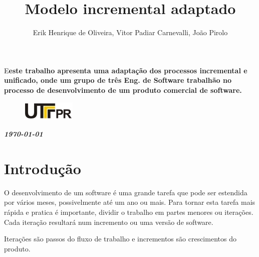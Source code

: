 \documentclass[	DIV=calc,%
							paper=a4,%
							fontsize=12pt,%
							onecolumn]{scrartcl}	 					%
\title{Modelo incremental adaptado }					%
\author{Erik Henrique de Oliveira, Vitor Padiar Carnevalli, João Pirolo }  	%
\date{}																				%
\newcommand{\initial}[1]{%
     \lettrine[lines=3,lhang=0.3,nindent=0em]{
     				\color{DarkGoldenrod}
     				{\textsf{#1}}}{}}
\begin{document}
\maketitle
\thispagestyle{fancy} 	
\thispagestyle{empty}		%




\initial{E}\textbf{este trabalho apresenta uma adaptação dos processos incremental e unificado, onde um grupo de três Eng. de Software trabalhão no processo de desenvolvimento de um produto comercial de software. } 

\begin{figure}
	\centering
	\includegraphics{utfpr}
\end{figure}

\vspace{3cm}
\centerline{\textit{\textbf{\today}}}

\clearpage
    \renewcommand*\listfigurename{Lista de figuras}
\listoffigures

\renewcommand*\listtablename{Lista de tabelas}
\listoftables




\clearpage
\renewcommand{\contentsname}{Sumário}
\tableofcontents
\clearpage

\section{Introdução}

O desenvolvimento de um software é uma grande tarefa que pode ser estendida por vários meses, possivelmente até um ano ou mais. Para tornar esta tarefa mais rápida e pratica é importante, dividir o trabalho em partes menores ou iterações. Cada iteração resultará num incremento ou uma versão de software. 

 Iterações são passos do fluxo de trabalho e incrementos são crescimentos do produto.
\end{document}
